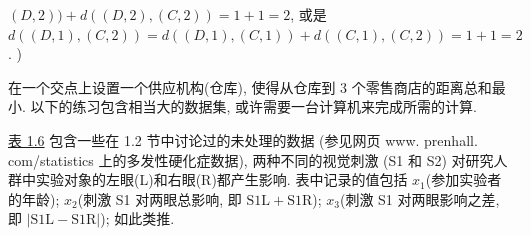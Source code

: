 
$(D,2))+d((D,2),(C,2))=1+1=2$, 或是 $d((D,1),(C,2))=d((D,1),(C,1))+d((C,1),%
(C,2))=1+1=2$. )

\begin{mvfigure}
\end{mvfigure}

在一个交点上设置一个供应机构(仓库), 使得从仓库到 3 个零售商店的距离总和最小. 以下的练习包含相当大的数据集, 或许需要一台计算机来完成所需的计算.

 \hyperref[tab:1.6]{表 1.6} 包含一些在 1.2 节中讨论过的未处理的数据 (参见网页 www. prenhall. com/statistics 上的多发性硬化症数据), 两种不同的视觉刺激 (S1 和 S2) 对研究人群中实验对象的左眼(L)和右眼(R)都产生影响. 表中记录的值包括 $x_1$(参加实验者的年龄); $x_2$(刺激 S1 对两眼总影响, 即 $\mathrm{S1L}+\mathrm{S1R}$); $x_3$(刺激 S1 对两眼影响之差, 即 $|\mathrm{S1L}-\mathrm{S1R}|$); 如此类推.

